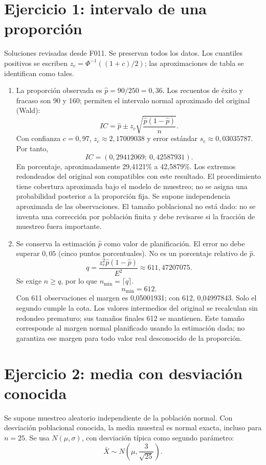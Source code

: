 \documentclass[11pt]{article}
\begin{document}
\section*{Ejercicio 1: intervalo de una proporción}
Soluciones revisadas desde F011. Se preservan todos los datos. Los cuantiles positivos se escriben $z_c=\Phi^{-1}((1+c)/2)$; las aproximaciones de tabla se identifican como tales.
\begin{enumerate}[label=(\alph*)]\item La proporción observada es $\widehat p=90/250=0,36$. Los recuentos de éxito y fracaso son 90 y 160; permiten el intervalo normal aproximado del original (Wald):
\[IC=\widehat p\pm z_c\sqrt{\frac{\widehat p(1-\widehat p)}{n}}.\]
Con confianza $c=0,97$, $z_c\approx2,17009038$ y error estándar $s_e\approx0,03035787$. Por tanto,
\[IC=\boxed{(0,29412069;\ 0,42587931)}.\]
En porcentaje, aproximadamente 29,4121\% a 42,5879\%. Los extremos redondeados del original son compatibles con este resultado.
El procedimiento tiene cobertura aproximada bajo el modelo de muestreo; no se asigna una probabilidad posterior a la proporción fija. Se supone independencia aproximada de las observaciones. El tamaño poblacional no está dado: no se inventa una corrección por población finita y debe revisarse si la fracción de muestreo fuera importante.
\item Se conserva la estimación $\widehat p$ como valor de planificación. El error no debe superar $0,05$ (cinco puntos porcentuales). No es un porcentaje relativo de $\widehat p$.
\[q=\frac{z_c^2\widehat p(1-\widehat p)}{E^2}\approx611,47207075.\]
Se exige $n\geq q$, por lo que $n_{\min}=\lceil q\rceil$.
\[\boxed{n_{\min}=612}.\]
Con 611 observaciones el margen es 0,05001931; con 612, 0,04997843. Solo el segundo cumple la cota.
Los valores intermedios del original se recalculan sin redondeo prematuro; sus tamaños finales 612 se mantienen. Este tamaño corresponde al margen normal planificado usando la estimación dada; no garantiza ese margen para todo valor real desconocido de la proporción.
\end{enumerate}
\clearpage\section*{Ejercicio 2: media con desviación conocida}
Se supone muestreo aleatorio independiente de la población normal. Con desviación poblacional conocida, la media muestral es normal exacta, incluso para $n=25$. Se usa $N(\mu,\sigma)$, con desviación típica como segundo parámetro:
\[\bar X\sim N\left(\mu,\frac{3}{\sqrt{25}}\right).\]
\end{document}
